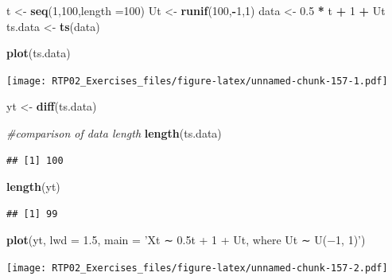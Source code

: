 \documentclass[
]{article}
\newenvironment{Shaded}{\begin{snugshade}}{\end{snugshade}}
\newcommand{\CommentTok}[1]{\textcolor[rgb]{0.56,0.35,0.01}{\textit{#1}}}
\newcommand{\DataTypeTok}[1]{\textcolor[rgb]{0.13,0.29,0.53}{#1}}
\newcommand{\DecValTok}[1]{\textcolor[rgb]{0.00,0.00,0.81}{#1}}
\newcommand{\FloatTok}[1]{\textcolor[rgb]{0.00,0.00,0.81}{#1}}
\newcommand{\KeywordTok}[1]{\textcolor[rgb]{0.13,0.29,0.53}{\textbf{#1}}}
\newcommand{\NormalTok}[1]{#1}
\newcommand{\OperatorTok}[1]{\textcolor[rgb]{0.81,0.36,0.00}{\textbf{#1}}}
\newcommand{\StringTok}[1]{\textcolor[rgb]{0.31,0.60,0.02}{#1}}
\begin{document}
\begin{Shaded}
\begin{Highlighting}[]
\NormalTok{t <-}\StringTok{ }\KeywordTok{seq}\NormalTok{(}\DecValTok{1}\NormalTok{,}\DecValTok{100}\NormalTok{,}\DataTypeTok{length =}\DecValTok{100}\NormalTok{)}
\NormalTok{Ut <-}\StringTok{ }\KeywordTok{runif}\NormalTok{(}\DecValTok{100}\NormalTok{,}\OperatorTok{-}\DecValTok{1}\NormalTok{,}\DecValTok{1}\NormalTok{)}
\NormalTok{data <-}\StringTok{ }\FloatTok{0.5} \OperatorTok{*}\StringTok{ }\NormalTok{t }\OperatorTok{+}\StringTok{ }\DecValTok{1} \OperatorTok{+}\StringTok{ }\NormalTok{Ut}
\NormalTok{ts.data <-}\StringTok{ }\KeywordTok{ts}\NormalTok{(data)}

\KeywordTok{plot}\NormalTok{(ts.data)}
\end{Highlighting}
\end{Shaded}

\texttt{[image: RTP02\_Exercises\_files/figure-latex/unnamed-chunk-157-1.pdf]}

\begin{Shaded}
\begin{Highlighting}[]
\NormalTok{yt <-}\StringTok{ }\KeywordTok{diff}\NormalTok{(ts.data)}

\CommentTok{#comparison of data length}
\KeywordTok{length}\NormalTok{(ts.data)}
\end{Highlighting}
\end{Shaded}

\begin{verbatim}
## [1] 100
\end{verbatim}

\begin{Shaded}
\begin{Highlighting}[]
\KeywordTok{length}\NormalTok{(yt)}
\end{Highlighting}
\end{Shaded}

\begin{verbatim}
## [1] 99
\end{verbatim}

\begin{Shaded}
\begin{Highlighting}[]
\KeywordTok{plot}\NormalTok{(yt, }\DataTypeTok{lwd =} \FloatTok{1.5}\NormalTok{, }\DataTypeTok{main =} \StringTok{'Xt ∼ 0.5t + 1 + Ut, where Ut ∼ U(−1, 1)'}\NormalTok{)}
\end{Highlighting}
\end{Shaded}

\texttt{[image: RTP02\_Exercises\_files/figure-latex/unnamed-chunk-157-2.pdf]}
\end{document}
